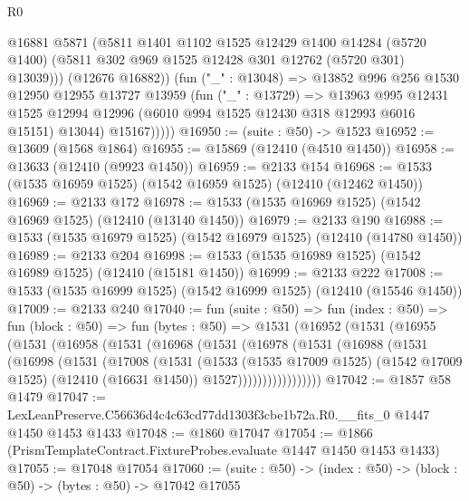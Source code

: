 \begin{lexlean}{R0}
\begin{coremodule}
                @16881
                @5871
                (@5811
                  @1401
                  @1102
                  @1525
                  @12429
                  @1400
                  @14284
                  (@5720 @1400)
                  (@5811 @302 @969 @1525 @12428 @301 @12762 (@5720 @301) @13039)))
              (@12676 @16882))
            (fun ("_" : @13048) =>
            @13852
              @996
              @256
              @1530
              @12950
              @12955
              @13727
              @13959
              (fun ("_" : @13729) =>
              @13963
                @995
                @12431
                @1525
                @12994
                @12996
                (@6010 @994 @1525 @12430 @318 @12993 @6016 @15151)
                @13044)
              @15167)))))
@16950 := (suite : @50) -> @1523
@16952 := @13609 (@1568 @1864)
@16955 := @15869 (@12410 (@4510 @1450))
@16958 := @13633 (@12410 (@9923 @1450))
@16959 := @2133 @154
@16968 := @1533 (@1535 @16959 @1525) (@1542 @16959 @1525) (@12410 (@12462 @1450))
@16969 := @2133 @172
@16978 := @1533 (@1535 @16969 @1525) (@1542 @16969 @1525) (@12410 (@13140 @1450))
@16979 := @2133 @190
@16988 := @1533 (@1535 @16979 @1525) (@1542 @16979 @1525) (@12410 (@14780 @1450))
@16989 := @2133 @204
@16998 := @1533 (@1535 @16989 @1525) (@1542 @16989 @1525) (@12410 (@15181 @1450))
@16999 := @2133 @222
@17008 := @1533 (@1535 @16999 @1525) (@1542 @16999 @1525) (@12410 (@15546 @1450))
@17009 := @2133 @240
@17040 := fun (suite : @50) =>
  fun (index : @50) =>
  fun (block : @50) =>
  fun (bytes : @50) =>
  @1531
    (@16952
      (@1531
        (@16955
          (@1531
            (@16958
              (@1531
                (@16968
                  (@1531
                    (@16978
                      (@1531
                        (@16988
                          (@1531
                            (@16998
                              (@1531
                                (@17008
                                  (@1531
                                    (@1533
                                      (@1535 @17009 @1525)
                                      (@1542 @17009 @1525)
                                      (@12410 (@16631 @1450))
                                      @1527)))))))))))))))))
@17042 := @1857 @58 @1479
@17047 := LexLeanPreserve.C56636d4c4c63cd77dd1303f3cbe1b72a.R0.__fits_0 @1447 @1450 @1453 @1433
@17048 := @1860 @17047
@17054 := @1866 (PrismTemplateContract.FixtureProbes.evaluate @1447 @1450 @1453 @1433)
@17055 := @17048 @17054
@17060 := (suite : @50) -> (index : @50) -> (block : @50) -> (bytes : @50) -> @17042 @17055

\end{coremodule}
\end{lexlean}
